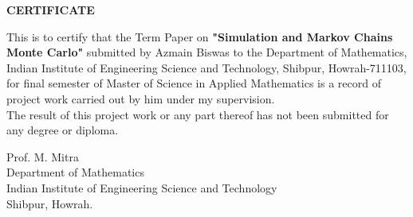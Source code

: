 \vspace{10cm}
\begin{center}
    \LARGE{\textbf{CERTIFICATE}}
\end{center}
\vspace*{2cm}
This is to certify that the Term Paper on \textbf{"Simulation and Markov Chains Monte Carlo"} submitted by Azmain Biswas to the Department of Mathematics, Indian Institute of Engineering Science and Technology, Shibpur, Howrah-711103, for final semester of Master of Science in Applied Mathematics is a record of project work carried out by him under my supervision. \\
The result of this project work or any part thereof has not been submitted for any degree or diploma.
\vspace{4cm}
\begin{flushright}
    Prof. M. Mitra\\
    Department of Mathematics\\
    Indian Institute of Engineering Science and Technology\\
    Shibpur, Howrah.
\end{flushright}
